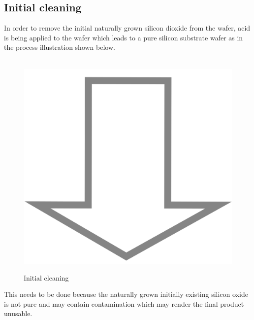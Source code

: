 \subsection{Initial cleaning}
In order to remove the initial naturally grown silicon dioxide from the wafer, acid is being applied to the wafer which leads to a pure silicon substrate wafer as in the process illustration shown below.

\begin{center}
	\begin{figure}[h]
		\begin{center}
			\begin{tikzpicture}[node distance = 3cm, auto, thick,scale=0.3, every node/.style={transform shape}]
				
			\end{tikzpicture} \\
			\includegraphics[scale=0.01]{down_arrow.png} \\
			\begin{tikzpicture}[node distance = 3cm, auto, thick,scale=0.3, every node/.style={transform shape}]
				
			\end{tikzpicture}
		\end{center}
		\caption{Initial cleaning}
	\end{figure}
\end{center}

This needs to be done because the naturally grown initially existing silicon oxide is not pure and may contain contamination which may render the final product unusable.

